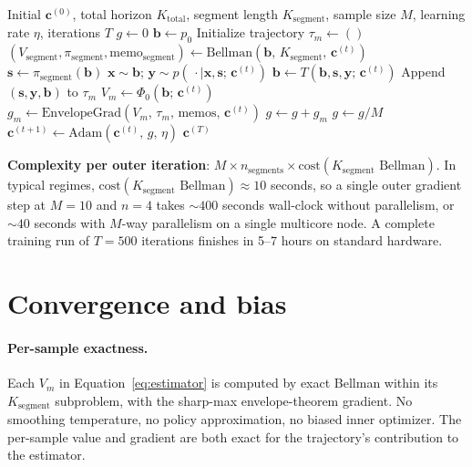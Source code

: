 \documentclass[11pt,a4paper]{article}
\newcommand{\bc}{\bm{c}}
\newcommand{\bx}{\bm{x}}
\newcommand{\by}{\bm{y}}
\newcommand{\bs}{\bm{s}}
\newcommand{\bb}{\bm{b}}
\begin{document}
\begin{algorithm}[H]
\caption{Stochastic Segmented DP}
\label{alg:ssdp}
\begin{algorithmic}[1]
\Require Initial $\bc^{(0)}$, total horizon $K_\mathrm{total}$, segment length $K_\mathrm{segment}$, sample size $M$, learning rate $\eta$, iterations $T$
    \State $g \gets 0$
        \State $\bb \gets p_0$
        \State Initialize trajectory $\tau_m \gets ()$
            \State $(V_\mathrm{segment}, \pi_\mathrm{segment}, \mathrm{memo}_\mathrm{segment}) \gets \mathrm{Bellman}(\bb,\, K_\mathrm{segment},\, \bc^{(t)})$
                \State $\bs \gets \pi_\mathrm{segment}(\bb)$
                \State $\bx \sim \bb$;  $\by \sim p(\,\cdot \mid \bx, \bs;\, \bc^{(t)})$
                \State $\bb \gets T(\bb, \bs, \by;\, \bc^{(t)})$
                \State Append $(\bs, \by, \bb)$ to $\tau_m$
            \EndFor
        \EndFor
        \State $V_m \gets \Phi_0(\bb;\, \bc^{(t)})$ 
        \State $g_m \gets \mathrm{EnvelopeGrad}(V_m,\, \tau_m,\, \mathrm{memos},\, \bc^{(t)})$
        \State $g \gets g + g_m$
    \EndFor
    \State $g \gets g / M$
    \State $\bc^{(t+1)} \gets \mathrm{Adam}(\bc^{(t)},\, g,\, \eta)$
\EndFor
\State \Return $\bc^{(T)}$
\end{algorithmic}
\end{algorithm}

\textbf{Complexity per outer iteration}: $M \times n_\mathrm{segments} \times
\mathrm{cost}(K_\mathrm{segment} \text{ Bellman})$.  In typical regimes,
$\mathrm{cost}(K_\mathrm{segment} \text{ Bellman}) \approx 10$ seconds, so a single outer
gradient step at $M = 10$ and $n = 4$ takes $\sim 400$ seconds wall-clock without
parallelism, or $\sim 40$ seconds with $M$-way parallelism on a single multicore node.
A complete training run of $T = 500$ iterations finishes in 5--7 hours on standard
hardware.

\section{Convergence and bias}
\label{sec:convergence}

\paragraph{Per-sample exactness.}  Each $V_m$ in Equation~\eqref{eq:estimator} is computed
by exact Bellman within its $K_\mathrm{segment}$ subproblem, with the sharp-max
envelope-theorem gradient.  No smoothing temperature, no policy approximation, no biased
inner optimizer.  The per-sample value and gradient are both exact for the trajectory's
contribution to the estimator.
\end{document}
